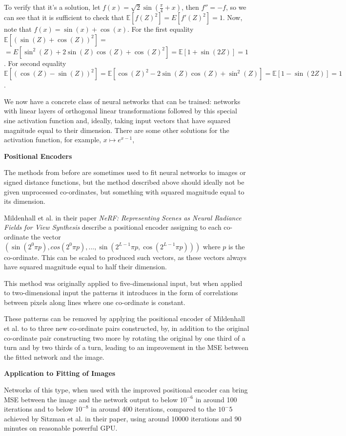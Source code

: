 \documentclass{letter}
\begin{document}
To verify that it's a solution, let $f(x)=\sqrt{2}\sin(\frac{\pi}{4}+x)$, then $f''=-f$, so we can see that it is sufficient to check that $\mathbb{E}[f(Z)^2]=E[f'(Z)^2]=1$. Now, note that $f(x)=\sin(x)+\cos(x)$. For the first equality $\mathbb{E}[(\sin(Z)+\cos(Z))^2]=$\newline$=E[\sin^2(Z)+2\sin(Z)\cos(Z)+\cos(Z)^2]=\mathbb{E}[1+\sin(2Z)]=1$. For second equality $\mathbb{E}[(\cos(Z)-\sin(Z))^2]=\mathbb{E}[\cos(Z)^2-2\sin(Z)\cos(Z)+\sin^2(Z)]=\mathbb{E}[1-\sin(2Z)]=1$.

We now have a concrete class of neural networks that can be trained: networks with linear layers of orthogonal linear transformations followed by this special sine activation function and, ideally, taking input vectors that have squared magnitude equal to their dimension. There are some other solutions for the activation function, for example, $x\mapsto e^{x-1}$, 

{\bf Positional Encoders}

The methods from before are sometimes used to fit neural networks to images or signed distance functions, but the method described above should ideally not be given unprocessed co-ordinates, but something with squared magnitude equal to its dimension. 

Mildenhall et al. in their paper {\it NeRF: Representing Scenes as Neural Radiance Fields for View Synthesis} describe a positional encoder assigning to each co-ordinate the vector $(\sin(2^0\pi p),cos(2^0\pi p),...,\sin(2^{L-1}\pi p,\cos(2^{L-1}\pi p)))$ where $p$ is the co-ordinate. This can be scaled to produced such vectors, as these vectors always have squared magnitude equal to half their dimension.

This method was originally applied to five-dimensional input, but when applied to two-dimensional input the patterns it introduces in the form of correlations between pixels along lines where one co-ordinate is constant.

These patterns can be removed by applying the positional encoder of Mildenhall et al. to to three new co-ordinate pairs constructed, by, in addition to the original co-ordinate pair constructing two more by rotating the original by one third of a turn and by two thirds of a turn, leading to an improvement in the MSE between the fitted network and the image.

{\bf Application to Fitting of Images}

Networks of this type, when used with the improved positional encoder can bring MSE between the image and the network output to below $10^{-6}$ in around 100 iterations and to below $10^{-8}$ in around 400 iterations, compared to the $10^-5$ achieved by Sitzman et al. in their paper, using around 10000 iterations and 90 minutes on reasonable powerful GPU.
\end{document}
